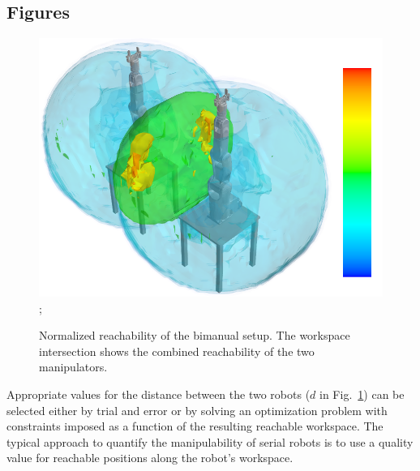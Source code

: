 \documentclass[letterpaper, 10 pt, conference]{ieeeconf}
\newcommand{\fref}[1]{Fig.~\ref{#1}}
\begin{document}
\subsection{Figures}
\begin{figure}[!htb]
  \centering
  \includegraphics[width=\linewidth]{workspace};
  \caption{Normalized reachability of the bimanual setup. The workspace intersection shows the combined reachability of the two manipulators.}
  \label{fig:workspace}
\end{figure}
Appropriate values for the distance between the two robots ($d$ in \fref{fig:workspace}) can be selected either by trial and error or by solving an optimization problem with constraints imposed as a function of the resulting reachable workspace. The typical approach to quantify the manipulability of serial robots is to use a quality value for reachable positions along the robot's workspace.
\end{document}
